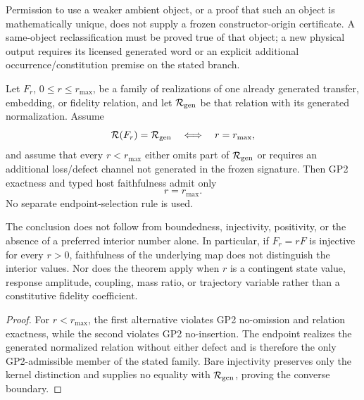 \documentclass[12pt,a4paper]{article}
\begin{document}
\begin{corollary}
\label{p2a:cor:no-bare-permission-relaxation}
Permission to use a weaker ambient object, or a proof that such an object is
mathematically unique, does not supply a frozen constructor-origin
certificate. A same-object reclassification must be proved true of that
object; a new physical output requires its licensed generated word or an
explicit additional occurrence/constitution premise on the stated branch.
\end{corollary}

\begin{theorem}
\label{p2:thm:gp2-exact-fidelity-endpoint}
Let \(F_r\), \(0\le r\le r_{\max}\), be a family of realizations of one
already generated transfer, embedding, or fidelity relation, and let
\(\mathcal R_{\rm gen}\) be that relation with its generated normalization.
Assume
\[
 \mathcal R(F_r)=\mathcal R_{\rm gen}
 \quad\Longleftrightarrow\quad
 r=r_{\max},
\]
and assume that every \(r<r_{\max}\) either omits part of
\(\mathcal R_{\rm gen}\) or requires an additional loss/defect channel not
generated in the frozen signature.  Then GP2 exactness and typed host
faithfulness admit only
\[
 r=r_{\max}.
\]
No separate endpoint-selection rule is used.

The conclusion does not follow from boundedness, injectivity, positivity, or
the absence of a preferred interior number alone.  In particular, if
\(F_r=rF\) is injective for every \(r>0\), faithfulness of the underlying map
does not distinguish the interior values.  Nor does the theorem apply when
\(r\) is a contingent state value, response amplitude, coupling, mass ratio,
or trajectory variable rather than a constitutive fidelity coefficient.
\end{theorem}

\begin{proof}
For \(r<r_{\max}\), the first alternative violates GP2 no-omission and
relation exactness, while the second violates GP2 no-insertion.  The endpoint
realizes the generated normalized relation without either defect and is
therefore the only GP2-admissible member of the stated family.  Bare
injectivity preserves only the kernel distinction and supplies no equality
with \(\mathcal R_{\rm gen}\), proving the converse boundary.
\end{proof}
\end{document}
